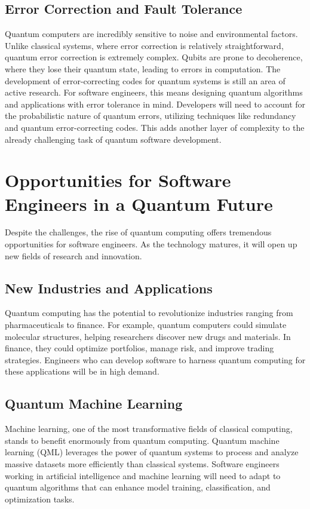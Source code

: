 \documentclass{article}
\begin{document}
\subsection{Error Correction and Fault Tolerance}
Quantum computers are incredibly sensitive to noise and environmental factors. Unlike classical systems, where error correction is relatively straightforward, quantum error correction is extremely complex. Qubits are prone to decoherence, where they lose their quantum state, leading to errors in computation. The development of error-correcting codes for quantum systems is still an area of active research.
For software engineers, this means designing quantum algorithms and applications with error tolerance in mind. Developers will need to account for the probabilistic nature of quantum errors, utilizing techniques like redundancy and quantum error-correcting codes. This adds another layer of complexity to the already challenging task of quantum software development.

\section{Opportunities for Software Engineers in a Quantum Future}

Despite the challenges, the rise of quantum computing offers tremendous opportunities for software engineers. As the technology matures, it will open up new fields of research and innovation.

\subsection{New Industries and Applications}

Quantum computing has the potential to revolutionize industries ranging from pharmaceuticals to finance. For example, quantum computers could simulate molecular structures, helping researchers discover new drugs and materials. In finance, they could optimize portfolios, manage risk, and improve trading strategies. Engineers who can develop software to harness quantum computing for these applications will be in high demand.

\subsection{Quantum Machine Learning} 

Machine learning, one of the most transformative fields of classical computing, stands to benefit enormously from quantum computing. Quantum machine learning (QML) leverages the power of quantum systems to process and analyze massive datasets more efficiently than classical systems. Software engineers working in artificial intelligence and machine learning will need to adapt to quantum algorithms that can enhance model training, classification, and optimization tasks.
\end{document}
